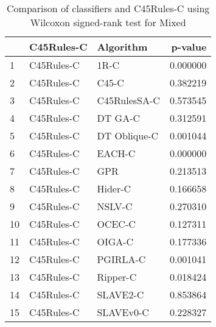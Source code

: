 \begin{table}
\footnotesize
\caption{Comparison of classifiers and C45Rules-C using Wilcoxon signed-rank test for Mixed}
\label{tab:C45Rules-C wilcoxon Mixed comparison}
\begin{tabular}{lllr}
\hline
 & C45Rules-C & Algorithm & p-value \\
\hline
1 & C45Rules-C & 1R-C & 0.000000 \\
2 & C45Rules-C & C45-C & 0.382219 \\
3 & C45Rules-C & C45RulesSA-C & 0.573545 \\
4 & C45Rules-C & DT GA-C & 0.312591 \\
5 & C45Rules-C & DT Oblique-C & 0.001044 \\
6 & C45Rules-C & EACH-C & 0.000000 \\
7 & C45Rules-C & GPR & 0.213513 \\
8 & C45Rules-C & Hider-C & 0.166658 \\
9 & C45Rules-C & NSLV-C & 0.270310 \\
10 & C45Rules-C & OCEC-C & 0.127311 \\
11 & C45Rules-C & OIGA-C & 0.177336 \\
12 & C45Rules-C & PGIRLA-C & 0.001041 \\
13 & C45Rules-C & Ripper-C & 0.018424 \\
14 & C45Rules-C & SLAVE2-C & 0.853864 \\
15 & C45Rules-C & SLAVEv0-C & 0.228327 \\
\hline
\end{tabular}
\end{table}
